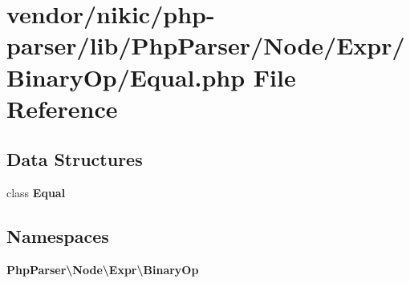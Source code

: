 \section{vendor/nikic/php-\/parser/lib/\+Php\+Parser/\+Node/\+Expr/\+Binary\+Op/\+Equal.php File Reference}
\label{_equal_8php}
\subsection*{Data Structures}
\begin{DoxyCompactItemize}
\item 
class {\bf Equal}
\end{DoxyCompactItemize}
\subsection*{Namespaces}
\begin{DoxyCompactItemize}
\item 
 {\bf Php\+Parser\textbackslash{}\+Node\textbackslash{}\+Expr\textbackslash{}\+Binary\+Op}
\end{DoxyCompactItemize}
